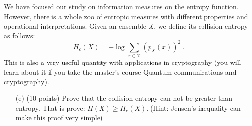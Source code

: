 We have focused our study on information measures on the entropy function. 
However, there is a whole zoo of entropic measures with different properties and operational interpretations. 
Given an ensemble $X$, we define its collision entropy as follows:$$H_c(X)=-\log\sum_{x\in\mathcal X}(p_X(x))^2\ .$$
This is also a very useful quantity with applications in cryptography (you will learn about it if you take the master's course Quantum communications and cryptography). 
\begin{enumerate}
\item[(e)] (10 points) Prove that the collision entropy can not be greater than entropy. 
That is prove: $H(X)\geq H_c(X)$. (Hint: Jensen's inequality can make this proof very simple)

\noindent{}

\end{enumerate}
